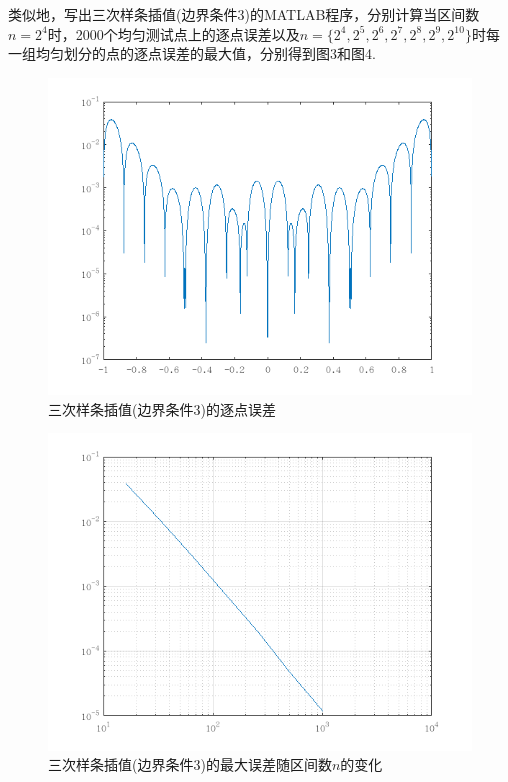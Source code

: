 \documentclass[12pt,a4paper,utf8]{ctexart}
\begin{document}
\begin{enumerate}
\begin{itemize}
    类似地，写出三次样条插值(边界条件3)的MATLAB程序，分别计算当区间数$n = 2^4$时，2000个均匀测试点上的逐点误差以及$n = \{2^4,2^5,2^6,2^7,2^8,2^9,2^{10}\}$时每一组均匀划分的点的逐点误差的最大值，分别得到图3和图4.

    \begin{figure}[htbp]
      \centering
      \includegraphics[scale=0.7]{pictures/p1_4_2.png}
      \caption{\small{三次样条插值(边界条件3)的逐点误差}} %
    \end{figure}

    \begin{figure}[htbp]
      \centering
      \includegraphics[scale=0.7]{pictures/p1_4_3.png}
      \caption{\small{三次样条插值(边界条件3)的最大误差随区间数$n$的变化}} %
    \end{figure}


\end{itemize}
\end{enumerate}
\end{document}
